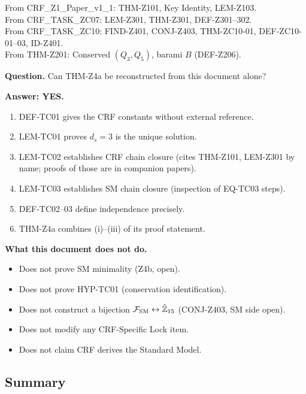 \documentclass[12pt, a4paper]{article}
\begin{document}
\begin{formalbox}[title={Atomic units inherited (not modified)}]
From CRF\_Z1\_Paper\_v1\_1: THM-Z101, Key Identity, LEM-Z103. \\
From CRF\_TASK\_ZC07: LEM-Z301, THM-Z301, DEF-Z301--302. \\
From CRF\_TASK\_ZC10: FIND-Z401, CONJ-Z403, THM-ZC10-01,
  DEF-ZC10-01--03, ID-Z401. \\
From THM-Z201: Conserved $(Q_3, Q_5)$, barami $B$ (DEF-Z206).
\end{formalbox}

\begin{formalbox}[title={Reconstruction Test (CUIP No-Loss)}]
\textbf{Question.} Can THM-Z4a be reconstructed from this document
alone?

\textbf{Answer: YES.}
\begin{enumerate}[leftmargin=*]
  \item DEF-TC01 gives the CRF constants without external reference.
  \item LEM-TC01 proves $d_s = 3$ is the unique solution.
  \item LEM-TC02 establishes CRF chain closure (cites THM-Z101,
    LEM-Z301 by name; proofs of those are in companion papers).
  \item LEM-TC03 establishes SM chain closure (inspection of
    EQ-TC03 steps).
  \item DEF-TC02--03 define independence precisely.
  \item THM-Z4a combines (i)--(iii) of its proof statement.
\end{enumerate}

\textbf{What this document does not do.}
\begin{itemize}[leftmargin=*]
  \item Does not prove SM minimality (Z4b, open).
  \item Does not prove HYP-TC01 (conservation identification).
  \item Does not construct a bijection $\mathcal{F}_{\rm SM}
    \leftrightarrow \hat{\mathbb{Z}}_{15}$ (CONJ-Z403, SM side open).
  \item Does not modify any CRF-Specific Lock item.
  \item Does not claim CRF derives the Standard Model.
\end{itemize}
\end{formalbox}

\subsection{Summary}
\label{sec:summary}
\end{document}
